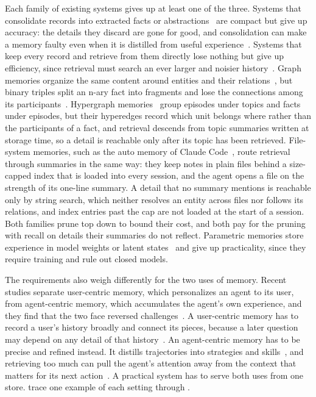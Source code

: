 Each family of existing systems gives up at least one of the three. Systems
that consolidate records into extracted facts or
abstractions~\citep{mem0,ye2026autodreamer} are compact but give up accuracy:
the details they discard are gone for good, and consolidation can make a
memory faulty even when it is distilled from useful
experience~\citep{zhang2026faultymemories}. Systems that keep every record and
retrieve from them directly lose nothing but give up efficiency, since
retrieval must search an ever larger and noisier
history~\citep{agentmemorysurvey}. Graph memories organize the same content
around entities and their relations~\citep{zep,edge2024graphrag}, but binary
triples split an n-ary fact into fragments and lose the connections among its
participants~\citep{luo2025hypergraphrag}. Hypergraph
memories~\citep{hypermem} group episodes under topics and facts under
episodes, but their hyperedges record which unit belongs where rather than
the participants of a fact, and retrieval descends from topic summaries
written at storage time, so a detail is reachable only after its topic has
been retrieved. File-system memories, such as the auto memory of Claude
Code~\citep{claudecodememory}, route retrieval through summaries in the same way: they keep notes in plain
files behind a size-capped index that is loaded into every session, and the
agent opens a file on the strength of its one-line summary. A detail that no
summary mentions is reachable only by string search, which neither resolves
an entity across files nor follows its relations, and index entries past the
cap are not loaded at the start of a session. Both families prune top down to
bound their cost, and both pay for the pruning with recall on details their
summaries do not reflect. Parametric memories store experience in model
weights or latent states~\citep{memoryllm,mplus,self-param,behrouz2024titans}
and give up practicality, since they require training and rule out closed
models.


The requirements also weigh differently for the two uses of memory. Recent
studies separate user-centric memory, which personalizes an agent to its user,
from agent-centric memory, which accumulates the agent's own experience, and
they find that the two face reversed
challenges~\citep{agentmemorysurvey,harnessmemory}. A user-centric memory has
to record a user's history broadly and connect its pieces, because a later
question may depend on any detail of that history~\citep{memorycd,ma2026memaudit}.
An agent-centric memory has to be precise and refined instead. It distills
trajectories into strategies and
skills~\citep{zhao2024expel,ouyang2026reasoningbank,xia2026metaclaw}, and
retrieving too much can pull the agent's attention away from the context that
matters for its next action~\citep{harnessmemory}. A practical system has to
serve both uses from one store.
 trace one example of each
setting through \ours.

